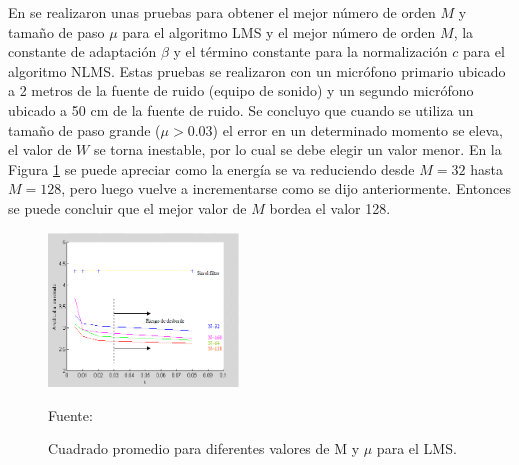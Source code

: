\begin{enumerate}
\begin{enumerate}
En \citep{simon} se realizaron unas pruebas para obtener el mejor número de orden $M$ y tamaño de paso $\mu$ para el algoritmo LMS y el mejor número de orden $M$, la constante de adaptación $\beta$ y el término constante para la normalización $c$ para el algoritmo NLMS. Estas pruebas se realizaron con un micrófono primario ubicado a 2 metros de la fuente de ruido (equipo de sonido) y un segundo micrófono ubicado a 50 cm de la fuente de ruido. Se concluyo que cuando se utiliza un tamaño de paso grande ($\mu > 0.03$) el error en un determinado momento se eleva, el valor de $W$ se torna inestable, por lo cual se debe elegir un valor menor. 
\vskip 0.5cm
En la Figura \ref{fig:figura2.21} se puede apreciar como la energía se va reduciendo desde $M=32$ hasta $M=128$, pero luego vuelve a incrementarse como se dijo anteriormente. Entonces se puede concluir que el mejor valor de $M$ bordea el valor 128.
\newpage
\begin{figure}[ht]
\begin{center}
\includegraphics[width=0.45\textwidth]{Imagenes/Cap2/image022}
\end{center}
\begin{center}
\vskip -0.5cm
\caption{\small{Cuadrado promedio para diferentes valores de M y $\mu$ para el LMS.}}
\label{fig:figura2.21}
{\small{Fuente: \cite{simon}}}
\end{center}
\end{figure}


\end{enumerate}
\end{enumerate}
